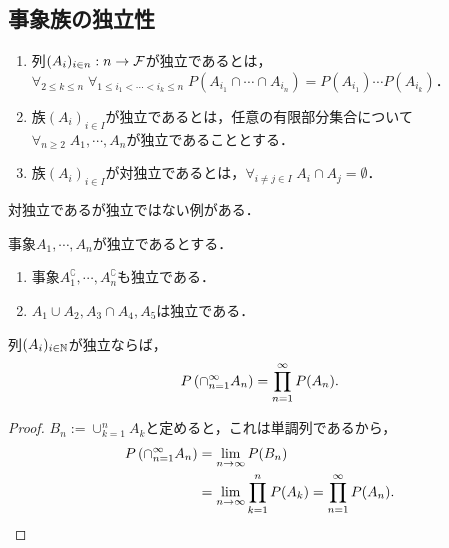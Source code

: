 \documentclass[uplatex,dvipdfmx]{jsreport}
\begin{document}
\subsection{事象族の独立性}

\begin{definition}\mbox{}
    \begin{enumerate}
        \item 列$(A_i)_{i\in n}:n\to\mathcal{F}$が独立であるとは，$\forall_{2\le k\le n}\;\forall_{1\le i_1<\cdots<i_k\le n}\;P(A_{i_1}\cap\cdots\cap A_{i_n})=P(A_{i_1})\cdots P(A_{i_k})$．
        \item 族$(A_i)_{i\in I}$が独立であるとは，任意の有限部分集合について$\forall_{n\ge 2}\;A_1,\cdots,A_nが独立$であることとする．
        \item 族$(A_i)_{i\in I}$が対独立であるとは，$\forall_{i\ne j\in I}\;A_i\cap A_j=\emptyset$．
    \end{enumerate}
\end{definition}

\begin{example}
    対独立であるが独立ではない例がある．
\end{example}

\begin{lemma}[独立性の遺伝]
    事象$A_1,\cdots,A_n$が独立であるとする．
    \begin{enumerate}
        \item 事象$A_1^\complement,\cdots,A_n^\complement$も独立である．
        \item $A_1\cup A_2, A_3\cap A_4,A_5$は独立である．
    \end{enumerate}
\end{lemma}

\begin{lemma}[独立事象に対する確率の関手性]\label{lemma-functority-on-independence}
    列$(A_i)_{i\in\mathbb{N}}$が独立ならば，
    \[P\left(\cap^\infty_{n=1}A_n\right)=\prod_{n=1}^\infty P(A_n).\]
\end{lemma}
\begin{proof}
    $B_n:=\cup^n_{k=1}A_k$と定めると，これは単調列であるから，
    \begin{align*}
        P\left(\cap^\infty_{n=1}A_n\right)&=\lim_{n\to\infty}P(B_n)\\
        &=\lim_{n\to\infty}\prod_{k=1}^nP(A_k)=\prod_{n=1}^\infty P(A_n).
    \end{align*}
\end{proof}
\end{document}
